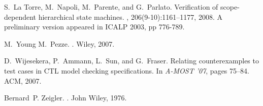 \documentclass[letterpaper,twocolumn,10pt]{article}
\begin{document}
\begin{thebibliography}{10}
S.~{La Torre}, M.~Napoli, M.~Parente, and G.~Parlato.
\newblock Verification of scope-dependent hierarchical state machines.
, 206(9-10):1161--1177, 2008. A
  preliminary version appeared in ICALP 2003, pp 776-789.

M.~Young M.~Pezze.
.
\newblock Wiley, 2007.

D.~Wijesekera, P.~Ammann, L.~Sun, and G.~Fraser.
\newblock Relating counterexamples to test cases in {CTL} model checking
  specifications.
\newblock In {\em A-MOST '07}, pages 75--84. ACM, 2007.

Bernard~P. Zeigler.
.
\newblock John Wiley, 1976.

\end{thebibliography}
\end{document}
